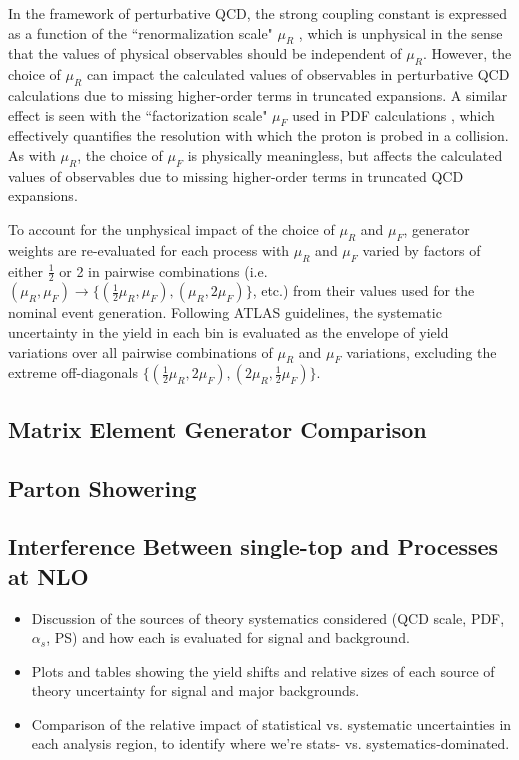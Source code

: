 In the framework of perturbative QCD, the strong coupling constant is expressed as a function of the ``renormalization scale" \(\mu_R\) \cite{PDG_2018}, which is unphysical in the sense that the values of physical observables should be independent of \(\mu_R\). However, the choice of \(\mu_R\) can impact the calculated values of observables in perturbative QCD calculations due to missing higher-order terms in truncated expansions. A similar effect is seen with the ``factorization scale" \(\mu_F\) used in PDF calculations \cite{maltoni2007choosing}, which effectively quantifies the resolution with which the proton is probed in a collision. As with \(\mu_R\), the choice of \(\mu_F\) is physically meaningless, but affects the calculated values of observables due to missing higher-order terms in truncated QCD expansions.

To account for the unphysical impact of the choice of \(\mu_R\) and \(\mu_F\), generator weights are re-evaluated for each process with \(\mu_R\) and \(\mu_F\) varied by factors of either \(\frac{1}{2}\) or 2 in pairwise combinations (i.e. \((\mu_R, \mu_F)\rightarrow \{(\frac{1}{2}\mu_R, \mu_F), (\mu_R, 2\mu_F)\}\), etc.) from their values used for the nominal event generation. Following ATLAS guidelines, the systematic uncertainty in the yield in each bin is evaluated as the envelope of yield variations over all pairwise combinations of \(\mu_R\) and \(\mu_F\) variations, excluding the extreme off-diagonals \(\{(\frac{1}{2}\mu_R, 2\mu_F), (2\mu_R, \frac{1}{2}\mu_F)\}\).

\subsection{Matrix Element Generator Comparison}

\subsection{Parton Showering}



\subsection{Interference Between single-top and \ttbar Processes at NLO}

\begin{itemize}
\item Discussion of the sources of theory systematics considered (QCD scale, PDF, $\alpha_s$, PS) and how each is evaluated for signal and background.
\item Plots and tables showing the yield shifts and relative sizes of each source of theory uncertainty for signal and major backgrounds.
\item Comparison of the relative impact of statistical vs. systematic uncertainties in each analysis region, to identify where we're stats- vs. systematics-dominated.
\end{itemize}